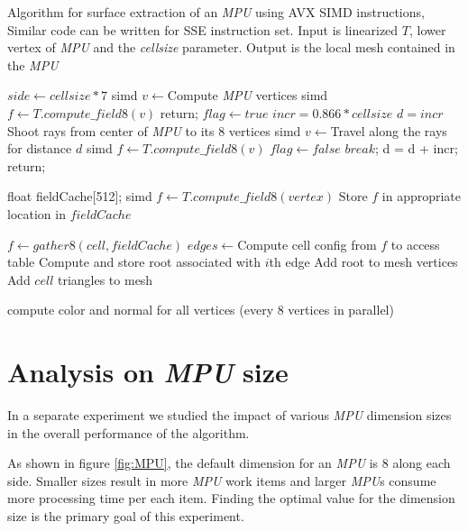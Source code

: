 \begin{algorithm}
\caption{Algorithm for surface extraction of an \textit{MPU} using AVX SIMD instructions,
Similar code can be written for SSE instruction set. 
Input is linearized \blob $T$, lower vertex of \textit{MPU} and the \textit{cellsize} parameter. 
Output is the local mesh contained in the \textit{MPU}}
\label{alg:surfaceextraction}
\begin{algorithmic}[1]		
	\STATE $side \gets cellsize*7$
	\STATE simd $v \gets $Compute \textit{MPU} vertices
	\STATE simd $f \gets T.compute\_field8(v)$
	  \STATE return;
	  \ENDIF	
	\ELSE 
	  \STATE $flag \gets true$
	  \STATE $incr = 0.866*cellsize$	  
	  \STATE $d = incr$
	  \STATE Shoot rays from center of \textit{MPU} to its 8 vertices
	  \STATE simd $v \gets $Travel along the rays for distance $d$     
	  \STATE simd $f \gets T.compute\_field8(v)$
	  \STATE $flag \gets false$
	  \STATE $break$;
	  \ENDIF
	  \STATE d = d + incr;
	  \ENDWHILE	
	  \STATE return;
	  \ENDIF	
	\ENDIF	
	
	\STATE float fieldCache[512];
	\STATE simd $f \gets T.compute\_field8(vertex)$
	\STATE Store $f$ in appropriate location in $fieldCache$
	\ENDFOR
	
	
		\STATE $f \gets gather8(cell, fieldCache)$
		\STATE $edges \gets $Compute cell config from $f$ to access table
			\STATE Compute and store root associated with $i$th edge		
			\STATE Add root to mesh vertices
			\ENDIF
		\ENDFOR				
		\STATE Add $cell$ triangles to mesh
	\ENDFOR	
	
	\STATE compute color and normal for all vertices (every 8 vertices in parallel)
\end{algorithmic}
\end{algorithm}

\section{Analysis on \textit{MPU} size}
\label{sec:ExperimentWithMPUDimensionSize}
In a separate experiment we studied the impact of various \textit{MPU} dimension 
sizes in the overall performance of the algorithm. 

As shown in figure \ref{fig:MPU}, the default dimension for an \textit{MPU} is 8 
along each side. Smaller sizes result in more \textit{MPU} work items and larger \textit{MPU}s consume
more processing time per each item. Finding the optimal value for the dimension size
is the primary goal of this experiment. 

